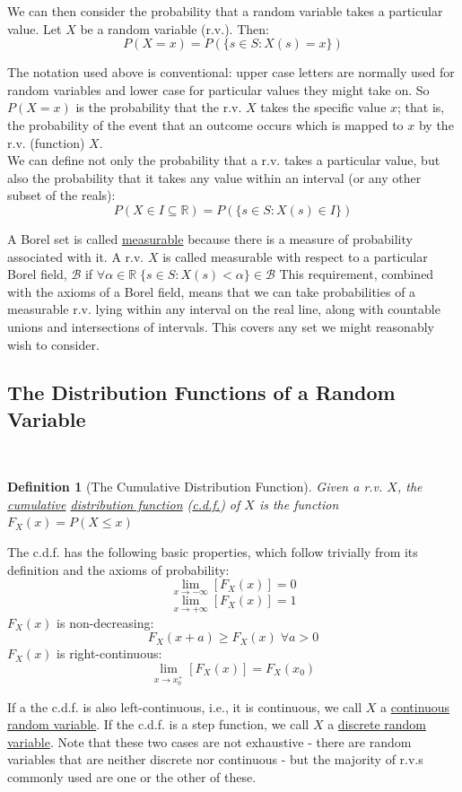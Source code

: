 \documentclass[12pt,a4paper]{article}
\newtheorem{defn}[thm]{Definition}
\begin{document}
We can then consider the probability that a random variable takes a particular value. Let $X$ be a random variable (r.v.). Then:
$$P(X = x) = P(\{s \in S : X(s) = x\})$$

The notation used above is conventional: upper case letters are normally used for random variables and lower case for particular values they might take on. So $P(X = x)$ is the probability that the r.v. $X$ takes the specific value $x$; that is, the probability of the event that an outcome occurs which is mapped to $x$ by the r.v. (function) $X$.\\
\indent We can define not only the probability that a r.v. takes a particular value, but also the probability that it takes any value within an interval (or any other subset of the reals):
$$P(X \in I \subseteq \mathbb{R}) = P(\{s \in S : X(s) \in I\})$$

A Borel set is called \underline{measurable} because there is a measure of probability associated with it. A r.v. $X$ is called measurable with respect to a particular Borel field, $\mathcal{B}$ if $\forall \alpha \in \mathbb{R} \; \{s \in S : X(s) < \alpha\} \in \mathcal{B}$ This requirement, combined with the axioms of a Borel field, means that we can take probabilities of a measurable r.v. lying within any interval on the real line, along with countable unions and intersections of intervals. This covers any set we might reasonably wish to consider.

\subsection{The Distribution Functions of a Random Variable}$\;$

\begin{defn}[The Cumulative Distribution Function]
\vspace{1cm}

Given a r.v. $X$, the \underline{cumulative} \underline{distribution function} (\underline{c.d.f.}) of $X$ is the function $F_X(x) = P(X \leq x)$
\end{defn}

The c.d.f. has the following basic properties, which follow trivially from its definition and the axioms of probability:
$$\lim_{x \rightarrow - \infty}[F_X(x)] = 0$$
$$\lim_{x \rightarrow + \infty}[F_X(x)] = 1$$
$F_X(x)$ is non-decreasing: $$F_X(x + a) \geq F_X(x)\; \forall a > 0$$
$F_X(x)$ is right-continuous: $$\lim_{x \rightarrow x_0^+}[F_X(x)] = F_X(x_0)$$

If a the c.d.f. is also left-continuous, i.e., it is continuous, we call $X$ a \underline{continuous random variable}. If the c.d.f. is a step function, we call $X$ a \underline{discrete random variable}. Note that these two cases are not exhaustive - there are random variables that are neither discrete nor continuous - but the majority of r.v.s commonly used are one or the other of these.
\end{document}
